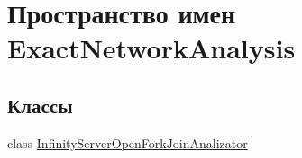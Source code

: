 \hypertarget{namespace_exact_network_analysis}{}\section{Пространство имен Exact\+Network\+Analysis}
\label{namespace_exact_network_analysis}
\subsection*{Классы}
\begin{DoxyCompactItemize}
\item 
class \hyperlink{class_exact_network_analysis_1_1_infinity_server_open_fork_join_analizator}{Infinity\+Server\+Open\+Fork\+Join\+Analizator}
\end{DoxyCompactItemize}
